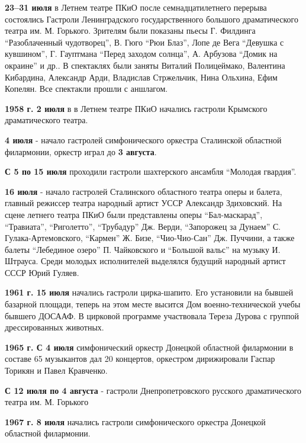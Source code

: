 \textbf{23–31 июля} в Летнем театре ПКиО после семнадцатилетнего перерыва состоялись
Гастроли Ленинградского государственного большого драматического театра им. М.
Горького. Зрителям были показаны пьесы Г. Филдинга \enquote{Разоблаченный чудотворец},
В. Гюго \enquote{Рюи Блаз}, Лопе де Вега \enquote{Девушка с кувшином}, Г. Гауптмана \enquote{Перед
заходом солнца}, А. Арбузова \enquote{Домик на окраине} и др.. В спектаклях были заняты
Виталий Полицеймако, Валентина Кибардина, Александр Арди, Владислав Стржельчик,
Нина Ольхина, Ефим Копелян. Все спектакли прошли с аншлагом.


\textbf{1958 г. 2 июля} в в Летнем театре ПКиО начались гастроли Крымского
драматического театра.

\textbf{4 июля} - начало гастролей симфонического оркестра Сталинской областной
филармонии, оркестр играл до \textbf{3 августа}.

\textbf{С 5 по 15 июля} проходили гастроли шахтерского ансамбля \enquote{Молодая гвардия}.

\textbf{16 июля} - начало гастролей Сталинского областного театра оперы и балета,
главный режиссер театра народный артист УССР Александр Здиховский. На сцене
летнего театра ПКиО были представлены оперы \enquote{Бал-маскарад}, \enquote{Травиата},
\enquote{Риголетто}, \enquote{Трубадур} Дж. Верди, \enquote{Запорожец за Дунаем} С.
Гулака-Артемовского, \enquote{Кармен} Ж. Бизе, \enquote{Чио-Чио-Сан} Дж. Пуччини, а также
балеты \enquote{Лебединое озеро} П. Чайковского и \enquote{Большой вальс} на музыку И. Штрауса.
Среди молодых исполнителей выделялся будущий народный артист СССР Юрий Гуляев.

\textbf{1961 г. 15 июля} начались гастроли цирка-шапито. Его установили на
бывшей базарной площади, теперь на этом месте высится Дом военно-технической
учебы бывшего ДОСААФ. В цирковой программе участвовала Тереза Дурова с группой
дрессированных животных.

\textbf{1965 г. С 4 июля} симфонический оркестр Донецкой областной филармонии в
составе 65 музыкантов дал 20 концертов, оркестром дирижировали Гаспар Торикян и
Павел Кравченко.

\textbf{С 12 июля по 4 августа} - гастроли Днепропетровского русского
драматического театра им. М. Горького

\textbf{1967 г. 8 июля} начались гастроли симфонического оркестра Донецкой
областной филармонии.

